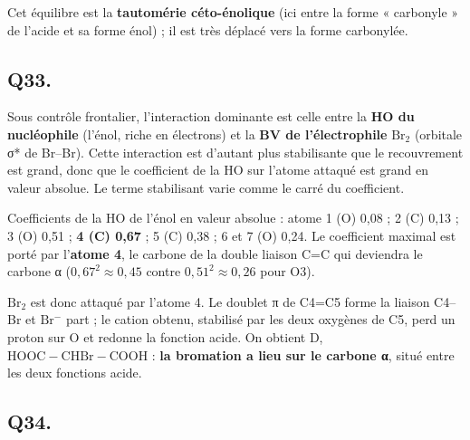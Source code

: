 \documentclass[11pt,a4paper]{article}
\newcommand{\equationajustee}[1]{%
  \sbox{\boiteequation}{$\displaystyle #1$}%
  \ifdim\wd\boiteequation>\linewidth
    \[\resizebox{\linewidth}{!}{\usebox{\boiteequation}}\]%
  \else
    \[#1\]%
  \fi}
\begin{document}
\equationajustee{\mathrm{HOOC{-}CH_2{-}C(=O)OH}\ \rightleftharpoons\ \mathrm{HOOC{-}CH{=}C(OH)_2}}

Cet équilibre est la \textbf{tautomérie céto-énolique} (ici entre la forme « carbonyle » de l'acide et sa forme énol) ; il est très déplacé vers la forme carbonylée.

\hypertarget{q33.}{%
\subsection{Q33.}\label{q33.}}

Sous contrôle frontalier, l'interaction dominante est celle entre la \textbf{HO du nucléophile} (l'énol, riche en électrons) et la \textbf{BV de l'électrophile} \(\mathrm{Br_2}\) (orbitale σ* de Br--Br). Cette interaction est d'autant plus stabilisante que le recouvrement est grand, donc que le coefficient de la HO sur l'atome attaqué est grand en valeur absolue. Le terme stabilisant varie comme le carré du coefficient.

Coefficients de la HO de l'énol en valeur absolue : atome 1 (O) 0,08 ; 2 (C) 0,13 ; 3 (O) 0,51 ; \textbf{4 (C) 0,67} ; 5 (C) 0,38 ; 6 et 7 (O) 0,24. Le coefficient maximal est porté par l'\textbf{atome 4}, le carbone de la double liaison C=C qui deviendra le carbone α (\(0{,}67^2\approx0{,}45\) contre \(0{,}51^2\approx0{,}26\) pour O3).

\(\mathrm{Br_2}\) est donc attaqué par l'atome 4. Le doublet π de C4=C5 forme la liaison C4--Br et \(\mathrm{Br^-}\) part ; le cation obtenu, stabilisé par les deux oxygènes de C5, perd un proton sur O et redonne la fonction acide. On obtient D, \(\mathrm{HOOC{-}CHBr{-}COOH}\) : \textbf{la bromation a lieu sur le carbone α}, situé entre les deux fonctions acide.

\hypertarget{q34.}{%
\subsection{Q34.}\label{q34.}}
\end{document}
